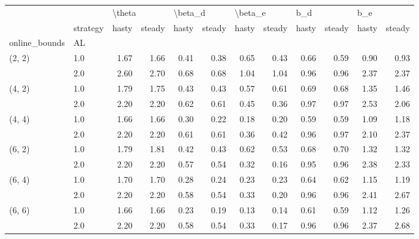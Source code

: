 \begin{tabular}{llrrrrrrrrrr}
\toprule
       & {} & \multicolumn{2}{l}{\textbackslash theta} & \multicolumn{2}{l}{\textbackslash beta\_d} & \multicolumn{2}{l}{\textbackslash beta\_e} & \multicolumn{2}{l}{b\_d} & \multicolumn{2}{l}{b\_e} \\
       & strategy &  hasty & steady &   hasty & steady &   hasty & steady & hasty & steady & hasty & steady \\
online\_bounds & AL &        &        &         &        &         &        &       &        &       &        \\
\midrule
(2, 2) & 1.0 &   1.67 &   1.66 &    0.41 &   0.38 &    0.65 &   0.43 &  0.66 &   0.59 &  0.90 &   0.93 \\
       & 2.0 &   2.60 &   2.70 &    0.68 &   0.68 &    1.04 &   1.04 &  0.96 &   0.96 &  2.37 &   2.37 \\
(4, 2) & 1.0 &   1.79 &   1.75 &    0.43 &   0.43 &    0.57 &   0.61 &  0.69 &   0.68 &  1.35 &   1.46 \\
       & 2.0 &   2.20 &   2.20 &    0.62 &   0.61 &    0.45 &   0.36 &  0.97 &   0.97 &  2.53 &   2.06 \\
(4, 4) & 1.0 &   1.66 &   1.66 &    0.30 &   0.22 &    0.18 &   0.20 &  0.59 &   0.59 &  1.09 &   1.18 \\
       & 2.0 &   2.20 &   2.20 &    0.61 &   0.61 &    0.36 &   0.42 &  0.96 &   0.97 &  2.10 &   2.37 \\
(6, 2) & 1.0 &   1.79 &   1.81 &    0.42 &   0.43 &    0.62 &   0.53 &  0.68 &   0.70 &  1.32 &   1.32 \\
       & 2.0 &   2.20 &   2.20 &    0.57 &   0.54 &    0.32 &   0.16 &  0.95 &   0.96 &  2.38 &   2.33 \\
(6, 4) & 1.0 &   1.70 &   1.70 &    0.28 &   0.24 &    0.23 &   0.23 &  0.64 &   0.62 &  1.15 &   1.19 \\
       & 2.0 &   2.20 &   2.20 &    0.58 &   0.54 &    0.33 &   0.20 &  0.96 &   0.96 &  2.41 &   2.67 \\
(6, 6) & 1.0 &   1.66 &   1.66 &    0.23 &   0.19 &    0.13 &   0.14 &  0.61 &   0.59 &  1.12 &   1.26 \\
       & 2.0 &   2.20 &   2.20 &    0.58 &   0.54 &    0.33 &   0.17 &  0.96 &   0.96 &  2.37 &   2.68 \\
\bottomrule
\end{tabular}
